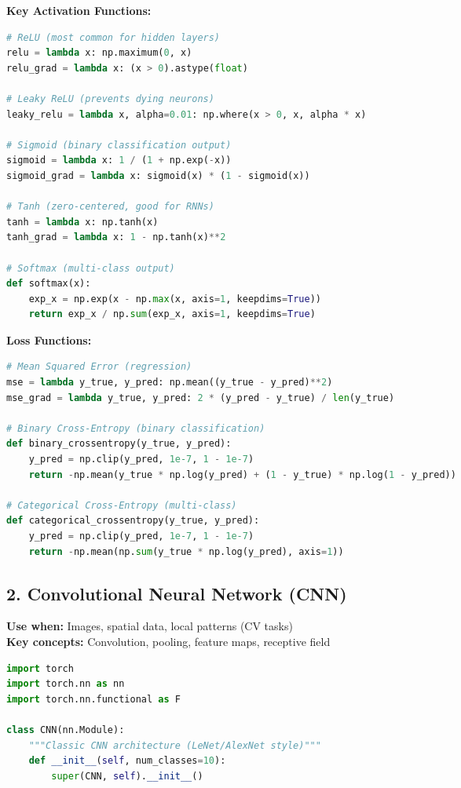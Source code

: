 \documentclass[8pt,landscape]{article}
\begin{document}
\begin{multicols}{3}
\textbf{Key Activation Functions:}
\begin{lstlisting}[language=Python]
# ReLU (most common for hidden layers)
relu = lambda x: np.maximum(0, x)
relu_grad = lambda x: (x > 0).astype(float)

# Leaky ReLU (prevents dying neurons)
leaky_relu = lambda x, alpha=0.01: np.where(x > 0, x, alpha * x)

# Sigmoid (binary classification output)
sigmoid = lambda x: 1 / (1 + np.exp(-x))
sigmoid_grad = lambda x: sigmoid(x) * (1 - sigmoid(x))

# Tanh (zero-centered, good for RNNs)
tanh = lambda x: np.tanh(x)
tanh_grad = lambda x: 1 - np.tanh(x)**2

# Softmax (multi-class output)
def softmax(x):
    exp_x = np.exp(x - np.max(x, axis=1, keepdims=True))
    return exp_x / np.sum(exp_x, axis=1, keepdims=True)
\end{lstlisting}

\textbf{Loss Functions:}
\begin{lstlisting}[language=Python]
# Mean Squared Error (regression)
mse = lambda y_true, y_pred: np.mean((y_true - y_pred)**2)
mse_grad = lambda y_true, y_pred: 2 * (y_pred - y_true) / len(y_true)

# Binary Cross-Entropy (binary classification)
def binary_crossentropy(y_true, y_pred):
    y_pred = np.clip(y_pred, 1e-7, 1 - 1e-7)
    return -np.mean(y_true * np.log(y_pred) + (1 - y_true) * np.log(1 - y_pred))

# Categorical Cross-Entropy (multi-class)
def categorical_crossentropy(y_true, y_pred):
    y_pred = np.clip(y_pred, 1e-7, 1 - 1e-7)
    return -np.mean(np.sum(y_true * np.log(y_pred), axis=1))
\end{lstlisting}

\subsection*{2. Convolutional Neural Network (CNN)}
\textbf{Use when:} Images, spatial data, local patterns (CV tasks) \\
\textbf{Key concepts:} Convolution, pooling, feature maps, receptive field
\begin{lstlisting}[language=Python]
import torch
import torch.nn as nn
import torch.nn.functional as F

class CNN(nn.Module):
    """Classic CNN architecture (LeNet/AlexNet style)"""
    def __init__(self, num_classes=10):
        super(CNN, self).__init__()


\end{lstlisting}
\end{multicols}
\end{document}
